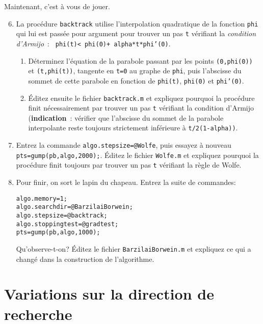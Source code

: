 \documentclass[10pt,a4paper,fleqn]{report}
\newcommand{\onit}{\begin{enumerate}}
\newcommand{\offit}{\end{enumerate}}
\renewcommand{\tt}{\texttt}
\begin{document}
\bigskip

Maintenant, c'est \`a vous de jouer.

\bigskip

\onit \setcounter{enumi}{5}
\item La proc\'edure \tt{backtrack} utilise l'interpolation quadratique de la fonction \tt{phi}  qui lui est pass\'ee pour argument pour trouver un pas \tt t v\'erifiant la \textit{condition d'Armijo}~:
\tt{ phi(t)< phi(0)+ alpha*t*phi'(0)}.
\onit
\item D\'eterminez l'\'equation de la parabole passant par les points \tt{(0,phi(0))} et \texttt{(t,phi(t))}, tangente en \tt{t=0} au graphe de \tt{phi}, puis l'abscisse du sommet de cette parabole en fonction de \tt{phi(t)}, \tt{phi(0)} et \tt{phi'(0)}.
\item \'Editez ensuite le fichier \tt{backtrack.m} et expliquez pourquoi la proc\'edure finit n\'ecessairement par trouver un pas \tt t v\'erifiant la condition d'Armijo (\textbf{indication}~: v\'erifier que l'abscisse du sommet de la parabole interpolante reste toujours strictement inf\'erieure \`a \tt{t/2(1-alpha))}.
\offit

\item Entrez la commande \tt{algo.stepsize=@Wolfe}, puis essayez \`a nouveau  \tt{pts=gump(pb,algo,2000);}. \'Editez le fichier \texttt{Wolfe.m} et expliquez pourquoi la proc\'edure finit toujours par trouver un pas \tt t v\'erifiant la r\`egle de Wolfe.

\item Pour finir, on sort le lapin du chapeau. Entrez la suite de commandes:

\hfill\parbox[t]{0.9 \textwidth}{
\tt{algo.memory=1;}\\
\tt{algo.searchdir=@BarzilaiBorwein;}\\
\tt{algo.stepsize=@backtrack;}\\
\tt{algo.stoppingtest=@gradtest;}\\
\tt{pts=gump(pb,algo,1000);}
}
\medskip

Qu'observe-t-on? \'Editez le fichier \tt{BarzilaiBorwein.m} et expliquez ce qui a chang\'e dans la construction de l'algorithme.
\offit

\bigskip

\section{Variations sur la direction de recherche}

\bigskip
\end{document}
